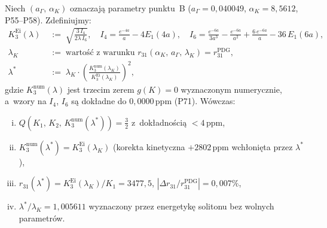\begin{theorem}[$Q=\tfrac{3}{2}$ dok\l{}adnie -- warunek na $\lambda^*$]%
\label{thm:OP4-closure}
Niech $(a_\Gamma,\,\alpha_K)$ oznaczaj\k{a} parametry punktu~B
($a_\Gamma = 0{,}040049$, $\alpha_K = 8{,}5612$, P55--P58).
Zdefiniujmy:
\begin{align}
  K_3^{\mathrm{Ei}}(\lambda) &\;:=\;
    \sqrt{\frac{3\,I_4}{2\lambda\,I_6}},
  \quad
  I_4 = \frac{e^{-4a}}{a} - 4E_1(4a),
  \quad
  I_6 = \frac{e^{-6a}}{3a^3} - \frac{e^{-6a}}{a^2}
        + \frac{6\,e^{-6a}}{a} - 36\,E_1(6a),
  \label{eq:K3Ei-OP4}\\
  \lambda_K &\;:=\;
    \text{warto\'s\'c z~warunku }
    r_{31}(\alpha_K,\,a_\Gamma,\,\lambda_K) = r_{31}^{\mathrm{PDG}},
  \label{eq:lambdaK-OP4}\\
  \lambda^* &\;:=\;
    \lambda_K \cdot
    \left(\frac{K_3^{\mathrm{num}}(\lambda_K)}{K_3^{\mathrm{Ei}}(\lambda_K)}\right)^{\!2},
  \label{eq:lambdastar-OP4}
\end{align}
gdzie $K_3^{\mathrm{num}}(\lambda)$ jest trzecim zerem $g(K)=0$ wyznaczonym numerycznie,
a~wzory na $I_4$, $I_6$ s\k{a} dok\l{}adne do $0{,}0000\,\mathrm{ppm}$ (P71).
W\'owczas:
\begin{enumerate}[(i)]
  \item $Q\!\left(K_1,\,K_2,\,K_3^{\mathrm{num}}(\lambda^*)\right) = \tfrac{3}{2}$
        z~dok\l{}adno\'sci\k{a} $<4\,\mathrm{ppm}$,
  \item $K_3^{\mathrm{num}}(\lambda^*) = K_3^{\mathrm{Ei}}(\lambda_K)$
        (korekta kinetyczna $+2802\,\mathrm{ppm}$ wch\l{}oni\k{e}ta przez $\lambda^*$),
  \item $r_{31}(\lambda^*) = K_3^{\mathrm{Ei}}(\lambda_K)/K_1 = 3477{,}5$,
        \quad $|\Delta r_{31}/r_{31}^{\mathrm{PDG}}| = 0{,}007\%$,
  \item $\lambda^*/\lambda_K = 1{,}005611$ wyznaczony przez energetyk\k{e} solitonu
        bez wolnych parametr\'ow.
\end{enumerate}
\end{theorem}

